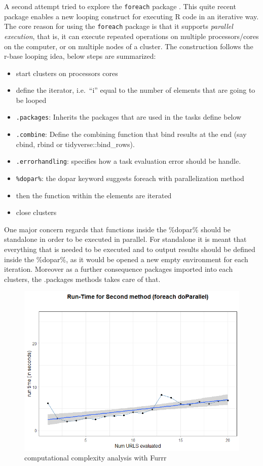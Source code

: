 \documentclass[
  12pt,
  a4paper,
  oneside]{book}
\providecommand{\tightlist}{%
  \setlength{\itemsep}{0pt}\setlength{\parskip}{0pt}}
\theoremstyle{definition}
\theoremstyle{definition}
\theoremstyle{definition}
\theoremstyle{remark}
\begin{document}
A second attempt tried to explore the \texttt{foreach} package \citep{foreach}. This quite recent package enables a new looping construct for executing R code in an iterative way. The core reason for using the \texttt{foreach} package is that it supports \emph{parallel execution}, that is, it can execute repeated operations on multiple processors/cores on the computer, or on multiple nodes of a cluster. The construction follows the r-base looping idea, below steps are summarized:

\begin{itemize}
\tightlist
\item
  start clusters on processors cores
\item
  define the iterator, i.e.~``i'' equal to the number of elements that are going to be looped
\item
  \texttt{.packages}: Inherits the packages that are used in the tasks define below
\item
  \texttt{.combine}: Define the combining function that bind results at the end (say cbind, rbind or tidyverse::bind\_rows).
\item
  \texttt{.errorhandling}: specifies how a task evaluation error should be handle.
\item
  \texttt{\%dopar\%}: the dopar keyword suggests foreach with parallelization method
\item
  then the function within the elements are iterated
\item
  close clusters
\end{itemize}

One major concern regards that functions inside the \%dopar\% should be standalone in order to be executed in parallel. For standalone it is meant that everything that is needed to be executed and to output results should be defined inside the \%dopar\%, as it would be opened a new empty environment for each iteration. Moreover as a further consequence packages imported into each clusters, the .packages methods takes care of that.

\begin{figure}
\centering
\includegraphics{images/run_timeforeach.png}
\caption{\label{fig:foreach}computational complexity analysis with Furrr}
\end{figure}
\end{document}
